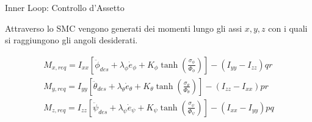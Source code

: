 \documentclass[aspectratio=169]{beamer} %
\begin{document}
\begin{frame}{Inner Loop: Controllo d'Assetto}


    Attraverso lo SMC vengono generati dei momenti lungo gli assi $x, y, z$ 
    con i quali si raggiungono gli angoli desiderati.

    \begin{align}
        M_{x,req} = I_{xx} \left[ \ddot{\phi}_{des} + \lambda_{\phi} \dot{e}_\phi + K_{\phi} \tanh\left( \frac{\sigma_\phi}{\Phi_{\phi}} \right) \right] - (I_{yy} - I_{zz})qr \\
        M_{y,req} = I_{yy} \left[ \ddot{\theta}_{des} + \lambda_{\theta} \dot{e}_\theta + K_{\theta} \tanh\left( \frac{\sigma_\theta}{\Phi_{\theta}} \right) \right] - (I_{zz} - I_{xx})pr\\
        M_{z,req} = I_{zz} \left[ \ddot{\psi}_{des} + \lambda_\psi \dot{e}_\psi + K_\psi \tanh\left( \frac{\sigma_\psi}{\Phi_{\psi}} \right) \right] - (I_{xx} - I_{yy})pq
    \end{align}

\end{frame}
\end{document}
